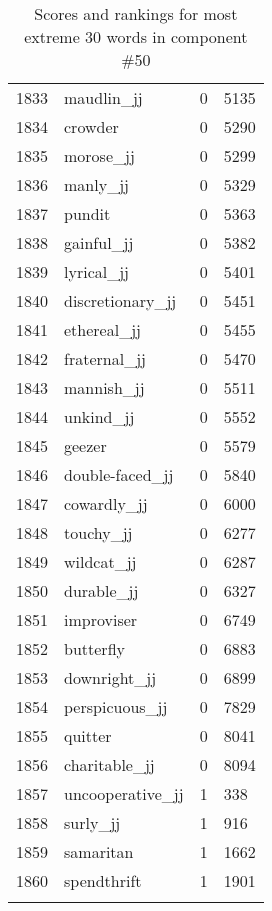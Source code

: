 \begin{longtable}[!htbp]{| rlr@{.}l |}
    1833 & maudlin\_jj & 0 & 5135 \\
    1834 & crowder & 0 & 5290 \\
    1835 & morose\_jj & 0 & 5299 \\
    1836 & manly\_jj & 0 & 5329 \\
    1837 & pundit & 0 & 5363 \\
    1838 & gainful\_jj & 0 & 5382 \\
    1839 & lyrical\_jj & 0 & 5401 \\
    1840 & discretionary\_jj & 0 & 5451 \\
    1841 & ethereal\_jj & 0 & 5455 \\
    1842 & fraternal\_jj & 0 & 5470 \\
    1843 & mannish\_jj & 0 & 5511 \\
    1844 & unkind\_jj & 0 & 5552 \\
    1845 & geezer & 0 & 5579 \\
    1846 & double-faced\_jj & 0 & 5840 \\
    1847 & cowardly\_jj & 0 & 6000 \\
    1848 & touchy\_jj & 0 & 6277 \\
    1849 & wildcat\_jj & 0 & 6287 \\
    1850 & durable\_jj & 0 & 6327 \\
    1851 & improviser & 0 & 6749 \\
    1852 & butterfly & 0 & 6883 \\
    1853 & downright\_jj & 0 & 6899 \\
    1854 & perspicuous\_jj & 0 & 7829 \\
    1855 & quitter & 0 & 8041 \\
    1856 & charitable\_jj & 0 & 8094 \\
    1857 & uncooperative\_jj & 1 & 338 \\
    1858 & surly\_jj & 1 & 916 \\
    1859 & samaritan & 1 & 1662 \\
    1860 & spendthrift & 1 & 1901 \\
    \hline
    \caption{Scores and rankings for most extreme 30 words in component \#50} \\
\end{longtable}
